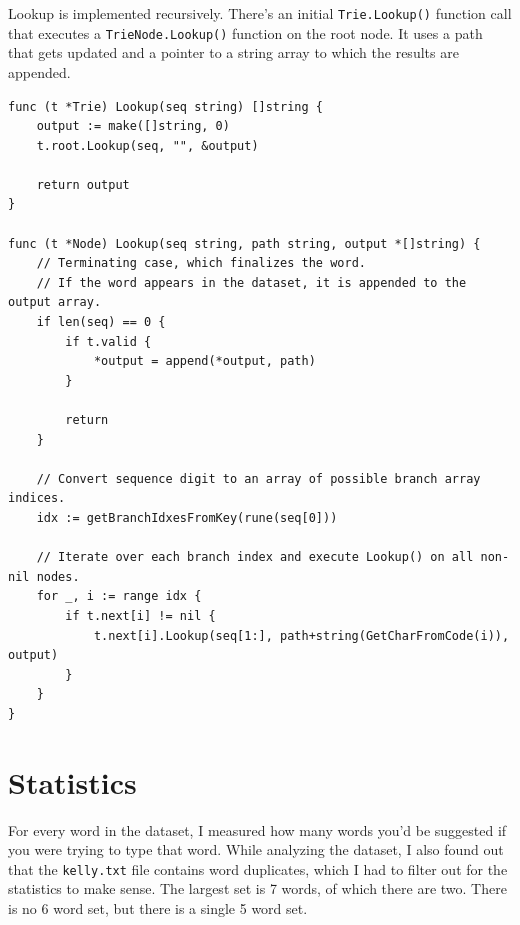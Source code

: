\documentclass[a4paper,11pt]{article}
\begin{document}
    Lookup is implemented recursively. There's an initial \texttt{Trie.Lookup()} function call that executes a \texttt{TrieNode.Lookup()} function on the root node. It uses a path that gets updated and a pointer to a string array to which the results are appended.

    \begin{verbatim}
func (t *Trie) Lookup(seq string) []string {
    output := make([]string, 0)
    t.root.Lookup(seq, "", &output)

    return output
}

func (t *Node) Lookup(seq string, path string, output *[]string) {
    // Terminating case, which finalizes the word.
    // If the word appears in the dataset, it is appended to the output array.
    if len(seq) == 0 {
        if t.valid {
            *output = append(*output, path)
        }

        return
    }

    // Convert sequence digit to an array of possible branch array indices.
    idx := getBranchIdxesFromKey(rune(seq[0]))

    // Iterate over each branch index and execute Lookup() on all non-nil nodes.
    for _, i := range idx {
        if t.next[i] != nil {
            t.next[i].Lookup(seq[1:], path+string(GetCharFromCode(i)), output)
        }
    }
}
    \end{verbatim}

    \section*{Statistics}

    For every word in the dataset, I measured how many words you'd be suggested if you were trying to type that word. While analyzing the dataset, I also found out that the \texttt{kelly.txt} file contains word duplicates, which I had to filter out for the statistics to make sense. The largest set is 7 words, of which there are two. There is no 6 word set, but there is a single 5 word set.
    
\end{document}
